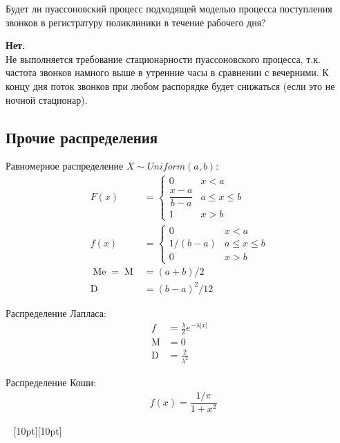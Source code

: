\documentclass[a4paper,12pt,fleqn]{article}
\newenvironment{onsamepage} {\begin{minipage}{\textwidth}} {\end{minipage}}
\numberwithin{figure}{section}
\theoremstyle{definition}
\let\leqs\leqslant
\DeclareMathOperator{\M}{M}
\DeclareMathOperator{\D}{D}
\DeclareMathOperator{\Me}{Me}
\def\vignette{\vspace{48pt} \noindent \hrulefill~
	          \raisebox{-8pt}[10pt][10pt]{\Huge\ding{102}}
	          ~\hrulefill}
\begin{document}
\begin{onsamepage}
\begin{problem}
	Будет ли пуассоновский процесс подходящей моделью процесса поступления
	звонков в регистратуру поликлиники в течение рабочего дня?
\end{problem}
\begin{solution}
  \textbf{Нет.}\\
	Не выполняется требование стационарности пуассоновского процесса, т.к.
	частота звонков намного выше в утренние часы в сравнении с вечерними.
	К концу дня поток звонков при любом распорядке будет снижаться
	(если это не ночной стационар).
\end{solution}
\end{onsamepage}


\subsection{Прочие распределения}

Равномерное распределение $X \sim Uniform(a,b)$:
\begin{align*}
	   F(x) &=
	   		\begin{cases}
	   			0	& x<a \\
		   		\dfrac{x-a}{b-a}	& a \leqs x \leqs b \\
		   		1	& x>b
			\end{cases}
	\\ f(x) &= \begin{cases}
				0		& x<a \\
				1/(b-a)	& a \leqs x \leqs b \\
				0		& x>b
			\end{cases}
	\\ \Me = \M &= (a+b)/2
	\\ \D &= (b-a)^2/12
\end{align*}


Распределение Лапласа:
\begin{align*}
	   f &= \frac{\lambda}2 e^{-\lambda|x|}
	\\ \M &= 0
	\\ \D &= \frac{2}{\lambda^2}
\end{align*}


Распределение Коши:
\begin{align*}
&	f(x)=\dfrac{1/\pi}{1+x^2}
\end{align*}


\vignette
\end{document}
